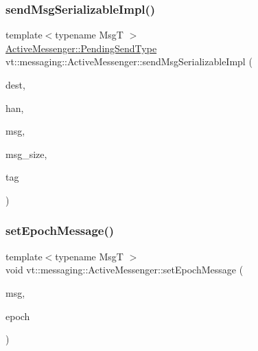 \subsubsection{\texorpdfstring{send\+Msg\+Serializable\+Impl()}{sendMsgSerializableImpl()}}
{\footnotesize\ttfamily template$<$typename MsgT $>$ \\
\hyperlink{structvt_1_1messaging_1_1_active_messenger_a3626a6ca76d8ad4ec7c3b47a2c70d3a8}{Active\+Messenger\+::\+Pending\+Send\+Type} vt\+::messaging\+::\+Active\+Messenger\+::send\+Msg\+Serializable\+Impl (\begin{DoxyParamCaption}\item[{\hyperlink{namespacevt_a866da9d0efc19c0a1ce79e9e492f47e2}{Node\+Type}}]{dest,  }\item[{\hyperlink{namespacevt_af64846b57dfcaf104da3ef6967917573}{Handler\+Type}}]{han,  }\item[{\hyperlink{structvt_1_1messaging_1_1_msg_shared_ptr}{Msg\+Shared\+Ptr}$<$ MsgT $>$ \&}]{msg,  }\item[{\hyperlink{namespacevt_aab8d55968084610ce3b17057981e9300}{Byte\+Type}}]{msg\+\_\+size,  }\item[{\hyperlink{namespacevt_a84ab281dae04a52a4b243d6bf62d0e52}{Tag\+Type}}]{tag }\end{DoxyParamCaption})}

\mbox{\label{structvt_1_1messaging_1_1_active_messenger_a5fc9cb79e5cbef41007d847964c17113}} 
\subsubsection{\texorpdfstring{set\+Epoch\+Message()}{setEpochMessage()}}
{\footnotesize\ttfamily template$<$typename MsgT $>$ \\
void vt\+::messaging\+::\+Active\+Messenger\+::set\+Epoch\+Message (\begin{DoxyParamCaption}\item[{MsgT $\ast$}]{msg,  }\item[{\hyperlink{namespacevt_a985a5adf291c34a3ca263b3378388236}{Epoch\+Type}}]{epoch }\end{DoxyParamCaption})}



